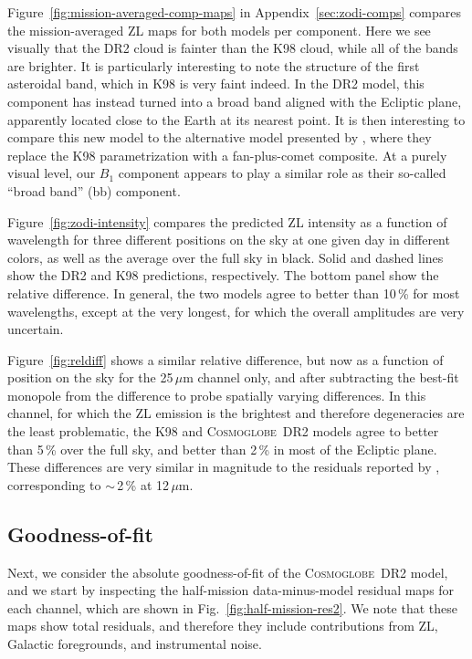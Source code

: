 \documentclass[twocolumn]{aa}
\newcommand{\cosmoglobe}{\textsc{Cosmoglobe}}
\begin{document}
Figure~\ref{fig:mission-averaged-comp-maps} in
Appendix~\ref{sec:zodi-comps} compares the mission-averaged ZL maps
for both models per component. Here we see visually that the DR2 cloud
is fainter than the K98 cloud, while all of the bands are brighter. It
is particularly interesting to note the structure of the first
asteroidal band, which in K98 is very faint indeed. In the DR2 model,
this component has instead turned into a broad band aligned with the
Ecliptic plane, apparently located close to the Earth at its nearest
point. It is then interesting to compare this new model to the
alternative model presented by \citet{Robinson2013}, where they
replace the K98 parametrization with a fan-plus-comet composite. At a
purely visual level, our $B_1$ component appears to play a similar
role as their so-called ``broad band'' (bb) component.

Figure~\ref{fig:zodi-intensity} compares the predicted ZL intensity
as a function of wavelength for three different positions on the sky
at one given day in different colors, as well as the average over the
full sky in black. Solid and dashed lines show the DR2 and K98
predictions, respectively. The bottom panel show the relative
difference. In general, the two models agree to better than 10\,\% for
most wavelengths, except at the very longest, for which the overall
amplitudes are very uncertain.

Figure~\ref{fig:reldiff} shows a similar relative difference, but now
as a function of position on the sky for the 25\,$\mu$m channel only,
and after subtracting the best-fit monopole from the difference to
probe spatially varying differences. In this channel, for which the ZL
emission is the brightest and therefore degeneracies are the least
problematic, the K98 and \cosmoglobe\ DR2 models agree to better than
5\,\% over the full sky, and better than 2\,\% in most of the Ecliptic
plane. These differences are very similar in magnitude to the
residuals reported by \citet{Kelsall1998}, corresponding to $\sim$\,2\,\% at 12\,$\mu$m.

\subsection{Goodness-of-fit}

Next, we consider the absolute goodness-of-fit of the \cosmoglobe\ DR2
model, and we start by inspecting the half-mission data-minus-model
residual maps for each channel, which are shown in
Fig.~\ref{fig:half-mission-res2}. We note that these maps show total
residuals, and therefore they include contributions from ZL, Galactic
foregrounds, and instrumental noise.
\end{document}
